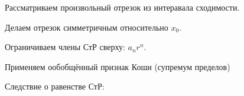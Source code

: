 \begin{col-answer-preambule}
\end{col-answer-preambule}

\begin{plan}
\item Рассматриваем произвольный отрезок из интеравала сходимости.
\item Делаем отрезок симметричным относительно $x_0$.
\item Ограничиваем члены СтР сверху: $a_n r^n$.
\item Применяем ообобщённый признак Коши (супремум пределов)
\end{plan}
Следствие о равенстве СтР:

